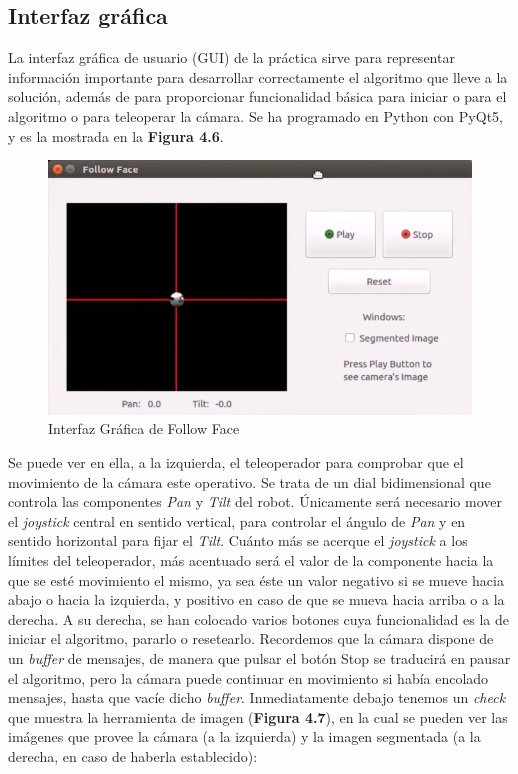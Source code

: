 \subsection{Interfaz gráfica}
La interfaz gráfica de usuario (GUI) de la práctica sirve para representar información importante para desarrollar correctamente el algoritmo que lleve a la solución, además de para proporcionar funcionalidad básica para iniciar o para el algoritmo o para teleoperar la cámara. Se ha programado en Python con PyQt5, y es la mostrada en la \textbf{Figura 4.6}.

\begin{figure}[H]
  \begin{center}
    \includegraphics[width=0.99\linewidth]{figures/guifollowface.png}
		\caption{Interfaz Gráfica de Follow Face}
		\label{fig.guifollowface}
		\end{center}
\end{figure}

Se puede ver en ella, a la izquierda, el teleoperador para comprobar que el movimiento de la cámara este operativo. Se trata de un dial bidimensional que controla las componentes \textit{Pan} y \textit{Tilt} del robot. Únicamente será necesario mover el \textit{joystick} central en sentido vertical, para controlar el ángulo de \textit{Pan} y en sentido horizontal para fijar el \textit{Tilt}. Cuánto más se acerque el \textit{joystick} a los límites del teleoperador, más acentuado será el valor de la componente hacia la que se esté movimiento el mismo, ya sea éste un valor negativo si se mueve hacia abajo o hacia la izquierda, y positivo en caso de que se mueva hacia arriba o a la derecha. A su derecha, se han colocado varios botones cuya funcionalidad es la de iniciar el algoritmo, pararlo o resetearlo. Recordemos que la cámara dispone de un \textit{buffer} de mensajes, de manera que pulsar el botón Stop se traducirá en pausar el algoritmo, pero la cámara puede continuar en movimiento si había encolado mensajes, hasta que vacíe dicho \textit{buffer}. Inmediatamente debajo tenemos un \textit{check} que muestra la herramienta de imagen (\textbf{Figura 4.7}), en la cual se pueden ver las imágenes que provee la cámara (a la izquierda) y la imagen segmentada (a la derecha, en caso de haberla establecido):

